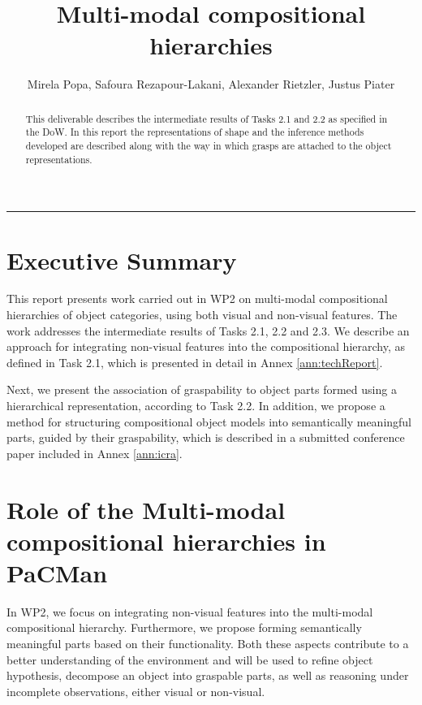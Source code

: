 \documentclass[a4paper,11pt,pdf]{../templates/pacmanreport}
\title{Multi-modal compositional hierarchies}
\author{Mirela Popa, Safoura Rezapour-Lakani, Alexander Rietzler, Justus Piater}
\begin{document}
\maketitle

\begin{abstract}
\noindent This deliverable describes the intermediate results of Tasks 2.1 and 2.2 as specified in the DoW. In this report the representations of shape and the inference methods developed are described along with the way in which grasps are attached to the object representations.
\end{abstract}

\vspace{.2em}
\hrule

\footnotesize

\tableofcontents

\normalsize

\newpage

\section*{Executive Summary}

This report presents work carried out in WP2 on multi-modal compositional hierarchies of object categories, using both visual and non-visual features. The work addresses the intermediate results of Tasks 2.1, 2.2 and 2.3. We describe an approach for integrating non-visual features into the compositional hierarchy, as defined in Task 2.1, which is presented in detail in Annex \ref{ann:techReport}. 

Next, we present the association of graspability to object parts formed using a hierarchical representation, according to Task 2.2. In addition, we propose a method for structuring compositional object models into semantically meaningful parts, guided by their graspability, which is described in a submitted conference paper included in Annex \ref{ann:icra}.

\section*{Role of the Multi-modal compositional hierarchies in PaCMan}

In WP2, we focus on integrating non-visual features into the multi-modal compositional hierarchy. Furthermore, we propose forming semantically meaningful parts based on their functionality. Both these aspects contribute to a better understanding of the environment and  will be used to refine object hypothesis, decompose an object into graspable parts, as well as reasoning under incomplete observations, either visual or non-visual.
\end{document}
